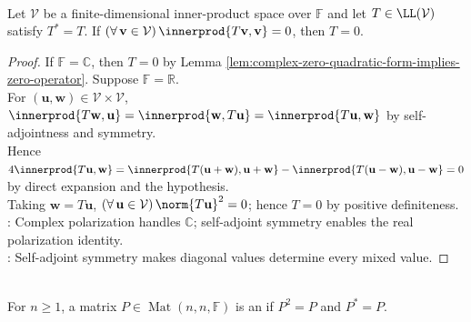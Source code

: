 \begin{proposition} \label{prop:self-adjoint-zero-quadratic-form-implies-zero} \\
Let $\mathcal{V}$ be a finite-dimensional inner-product space over $\mathbb{F}$ and let $T\in\LL(\mathcal{V})$ satisfy $T^*=T$. If $(\forall\,\mathbf{v}\in\mathcal{V})\,\innerprod{T\mathbf{v},\mathbf{v}}=0$, then $T=0$.
\begin{proof}
If $\mathbb{F}=\mathbb{C}$, then $T=0$ by Lemma \ref{lem:complex-zero-quadratic-form-implies-zero-operator}. Suppose $\mathbb{F}=\mathbb{R}$.\\
For $(\mathbf{u},\mathbf{w})\in\mathcal{V}\times\mathcal{V}$, $\innerprod{T\mathbf{w},\mathbf{u}}=\innerprod{\mathbf{w},T\mathbf{u}}=\innerprod{T\mathbf{u},\mathbf{w}}$ by self-adjointness and symmetry.\\
Hence $4\innerprod{T\mathbf{u},\mathbf{w}}=\innerprod{T(\mathbf{u}+\mathbf{w}),\mathbf{u}+\mathbf{w}}-\innerprod{T(\mathbf{u}-\mathbf{w}),\mathbf{u}-\mathbf{w}}=0$ by direct expansion and the hypothesis.\\
Taking $\mathbf{w}=T\mathbf{u}$, $(\forall\,\mathbf{u}\in\mathcal{V})\,\norm{T\mathbf{u}}^2=0$; hence $T=0$ by positive definiteness.\\
: Complex polarization handles $\mathbb{C}$; self-adjoint symmetry enables the real polarization identity.\\
: Self-adjoint symmetry makes diagonal values determine every mixed value.
\end{proof}
\end{proposition}

\begin{definition} \label{def:orthogonal-projection-matrix} \\
For $n\geq1$, a matrix $P\in\operatorname{Mat}(n,n,\mathbb{F})$ is an  if $P^2=P$ and $P^*=P$.
\end{definition}

